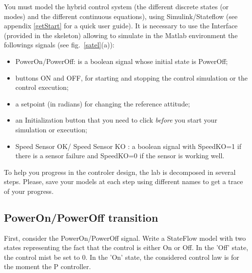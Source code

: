\documentclass[a4paper]{article}
\begin{document}
You must model the hybrid control system (the different discrete states (or modes) and 
the different continuous equations), using Simulink/Stateflow (see appendix \ref{getStart} 
for a quick user guide).
It is necessary to use the Interface (provided in the skeleton) allowing to simulate in the 
Matlab environment the followings signals (see fig.~\ref{satel}(a)):
\begin{itemize}
\item PowerOn/PowerOff: is a boolean signal whose initial state is PowerOff;
\item buttons ON and OFF, for starting and stopping the control simulation or the control execution;
\item a setpoint (in radians) for changing the reference attitude;
\item an Initialization button that you need to click \emph{before} you start your simulation or execution;
\item Speed Sensor OK/ Speed Sensor KO : a boolean signal with SpeedKO=1 if there is a sensor failure and SpeedKO=0 if the sensor is working well.
\end{itemize}

To help you progress in the controler design, the lab is decomposed in several steps. Please, save
your models at each step using different names to get a trace of your progress.

\subsection{PowerOn/PowerOff transition}
First, consider the PowerOn/PowerOff signal. Write a StateFlow model with two states representing
the fact that the control is either On or Off. In the 'Off' state, the control mist be set to $0$.
In the 'On' state, the considered control law is for the moment the P controller.
\end{document}
